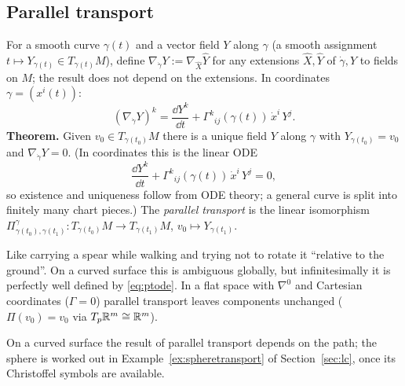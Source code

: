 \subsection{Parallel transport}
\begin{formal}
For a smooth curve $\gamma(t)$ and a vector field $Y$ along $\gamma$ (a smooth assignment $t\mapsto Y_{\gamma(t)}\in T_{\gamma(t)}M$), define $\nabla_{\dot\gamma}Y:=\nabla_{\hat X}\hat Y$ for any extensions $\hat X,\hat Y$ of $\dot\gamma, Y$ to fields on $M$; the result does not depend on the extensions. In coordinates $\gamma=(x^i(t))$:
\[
(\nabla_{\dot\gamma}Y)^k=\frac{\dd Y^k}{\dd t}+\Gamma^k{}_{ij}(\gamma(t))\,\dot x^i\,Y^j .
\]
\textbf{Theorem.} Given $v_0\in T_{\gamma(t_0)}M$ there is a unique field $Y$ along $\gamma$ with $Y_{\gamma(t_0)}=v_0$ and $\nabla_{\dot\gamma}Y=0$. (In coordinates this is the linear ODE
\begin{equation}\label{eq:ptode}
\frac{\dd Y^k}{\dd t}+\Gamma^k{}_{ij}(\gamma(t))\,\dot x^i\,Y^j=0,
\end{equation}
so existence and uniqueness follow from ODE theory; a general curve is split into finitely many chart pieces.) The \emph{parallel transport} is the linear isomorphism $\Pi^\gamma_{\gamma(t_0),\gamma(t_1)}:T_{\gamma(t_0)}M\to T_{\gamma(t_1)}M$, $v_0\mapsto Y_{\gamma(t_1)}$.
\end{formal}
\begin{intuition}
Like carrying a spear while walking and trying not to rotate it ``relative to the ground''. On a curved surface this is ambiguous globally, but infinitesimally it is perfectly well defined by \eqref{eq:ptode}. In a flat space with $\nabla^0$ and Cartesian coordinates ($\Gamma=0$) parallel transport leaves components unchanged ($\Pi(v_0)=v_0$ via $T_p\mathbb{R}^m\cong\mathbb{R}^m$).
\end{intuition}

On a curved surface the result of parallel transport depends on the path; the sphere is worked out in Example~\ref{ex:spheretransport}
of Section~\ref{sec:lc}, once its Christoffel symbols are available.
